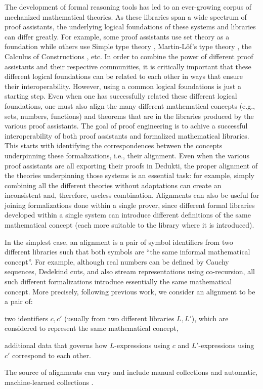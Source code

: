 The development of formal reasoning tools has led to an ever-growing
corpus of mechanized mathematical theories. As these libraries span a
wide spectrum of proof assistants, the underlying logical foundations
of these systems and libraries can differ greatly. For example, some
proof assistants use set theory as a foundation while others use
Simple type theory \cite{Church40}, Martin-L\"of's type theory
\cite{Martin-Lof84}, the Calculus of Constructions
\cite{CoquandHuet88}, etc.  In order to combine the power of different
proof assistants and their respective communities, it is critically
important that these different logical foundations can be related to
each other in ways that ensure their interoperability. However, using
a common logical foundations is just a starting step. Even when one
has successfully related these different logical foundations, one must
also align the many different mathematical concepts (e.g., sets,
numbers, functions) and theorems that are in the libraries produced by
the various proof assistants. The goal of proof engineering is to
achive a successful interoperability of both proof assistants and
formalized mathematical libraries. This starts with identifying the
correspondences between the concepts underpinning these
formalizations, i.e., their alignment. Even when the various proof
assistants are all exporting their proofs in Dedukti, the proper
alignment of the theories underpinning those systems is an essential
task: for example, simply combining all the different theories without
adaptations can create an inconsistent and, therefore, useless
combination.
%
Alignments can also be useful for joining formalizations done within a
single prover, since different formal libraries developed within a
single system can introduce different definitions of the same
mathematical concept (each more suitable to the library where it is
introduced).

In the simplest case, an alignment is a pair of symbol identifiers
from two different libraries such that both symbols are ``the same
informal mathematical concept''. For example, although real numbers
can be defined by Cauchy sequences, Dedekind cuts, and also stream
representations using co-recursion, all such different formalizations
introduce essentially the same mathematical concept. More precisely,
following previous work\cite{GKKMR:alignments:17,
DBLP:conf/mkm/DehayeIKKLMPRTW16}, we
consider an alignment to be a pair of:
\begin{compactitem}
  \item two identifiers $c,c'$ (usually from two different libraries
    $L,L'$), which are considered to represent the same mathematical
    concept,
  \item additional data that governs how $L$-expressions using $c$ and
    $L'$-expressions using $c'$ correspond to each other.
\end{compactitem}
The source of alignments can vary and include manual collections
\cite{MRLR:alignments:17} and automatic, machine-learned collections
\cite{GAUTHIER201989}.

